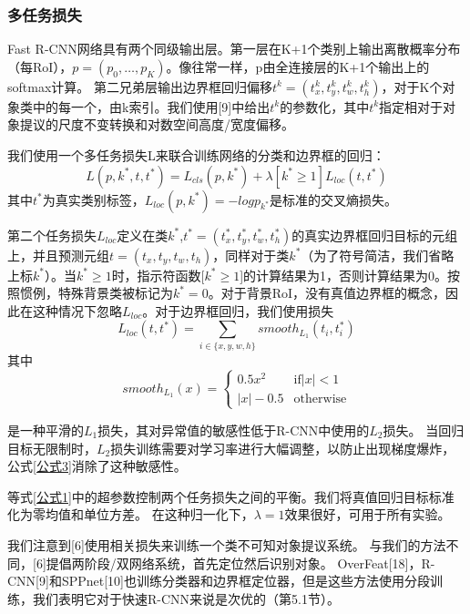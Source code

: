 \subsubsection{多任务损失}
\par Fast R-CNN网络具有两个同级输出层。第一层在K+1个类别上输出离散概率分布（每RoI），$p=(p_0,\dots,p_K)$。像往常一样，p由全连接层的K+1个输出上的softmax计算。 第二兄弟层输出边界框回归偏移$t^k=(t^k_x,t^k_y,t^k_w,t^k_h)$，对于K个对象类中的每一个，由k索引。我们使用[9]中给出$t^k$的参数化，其中$t^k$指定相对于对象提议的尺度不变转换和对数空间高度/宽度偏移。
\par 我们使用一个多任务损失L来联合训练网络的分类和边界框的回归：
\begin{equation}
    L(p,k^*,t,t^*)=L_{cls}(p,k^*)+\lambda[k^* \geq 1]L_{loc}(t,t^*)
    \label{公式1}
\end{equation}
其中$t^*$为真实类别标签，$L_{loc}(p,k^*)=-log p_{k^*}$是标准的交叉熵损失。
\par 第二个任务损失$L_{loc}$定义在类$k^*$,$t^*=(t^*_x,t^*_y,t^*_w,t^*_h)$的真实边界框回归目标的元组上，并且预测元组$t=(t_x,t_y,t_w,t_h)$，同样对于类$k^*$（为了符号简洁，我们省略上标$k^*$）。当$k^* \geq 1$时，指示符函数[$k^* \geq 1$]的计算结果为1，否则计算结果为0。按照惯例，特殊背景类被标记为$k^*=0$。对于背景RoI，没有真值边界框的概念，因此在这种情况下忽略$L_{loc}$。对于边界框回归，我们使用损失
\begin{equation}
    L_{loc}(t,t^*)=\sum_{i\in\{x,y,w,h\}}smooth_{L_1}(t_i,t^*_i)
    \label{公式2}
\end{equation}
其中
\begin{equation}
    smooth_{L_1}(x)=
    \begin{cases}
        0.5x^2  & \text{if}\left|x\right|<1 \\
        |x|-0.5 & \text{otherwise}
    \end{cases}
    \label{公式3}
\end{equation}

是一种平滑的$L_1$损失，其对异常值的敏感性低于R-CNN中使用的$L_2$损失。 当回归目标无限制时，$L_2$损失训练需要对学习率进行大幅调整，以防止出现梯度爆炸，公式\ref{公式3}消除了这种敏感性。
\par 等式\ref{公式1}中的超参数控制两个任务损失之间的平衡。我们将真值回归目标标准化为零均值和单位方差。 在这种归一化下，$\lambda=1$效果很好，可用于所有实验。
\par 我们注意到[6]使用相关损失来训练一个类不可知对象提议系统。 与我们的方法不同，[6]提倡两阶段/双网络系统，首先定位然后识别对象。 OverFeat[18]，R-CNN[9]和SPPnet[10]也训练分类器和边界框定位器，但是这些方法使用分段训练，我们表明它对于快速R-CNN来说是次优的（第5.1节）。
